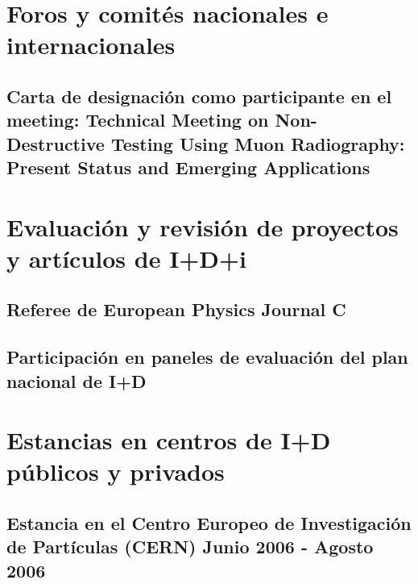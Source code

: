\documentclass[a4paper, 11pt, twoside, openright]{report}
\begin{document}
\section{Foros y comités nacionales e internacionales}

\subsection{Carta de designación como participante en el meeting: Technical Meeting on Non-Destructive Testing Using Muon Radiography: Present Status and Emerging Applications}






\section{Evaluación y revisión de proyectos y artículos de I+D+i}

\subsection{Referee de European Physics Journal C}



\subsection{Participación en paneles de evaluación del plan nacional de I+D}



\section{Estancias en centros de I+D públicos y privados}
\subsection{Estancia en el Centro Europeo de Investigación de Partículas (CERN) Junio 2006 - Agosto 2006}

\end{document}
